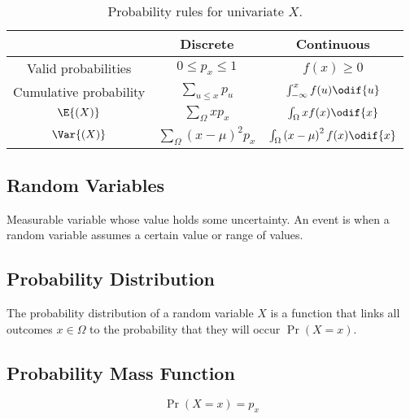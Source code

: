\documentclass{article}
\begin{document}
\begin{minipage}{126.1962963mm}
    \begin{table}[H]
        \centering
        \begin{tabular}{c c c }
            \toprule
                                       & \textbf{Discrete}                              & \textbf{Continuous}                                    \\
            \midrule
            Valid probabilities        & \(0 \leq p_x \leq 1\)                          & \(f(x) \geq 0\)                                        \\
            Cumulative probability     & \(\sum_{u \leq x} p_u\)                        & \(\int_{-\infty}^{x} f(u) \odif{u}\)                   \\
            \(\E{\left( X \right)}\)   & \(\sum_{\Omega} xp_x\)                         & \(\int_{\Omega} xf(x)\odif{x}\)                        \\
            \(\Var{\left( X \right)}\) & \(\sum_{\Omega} \left( x - \mu \right)^2 p_x\) & \(\int_{\Omega} \left( x - \mu \right)^2f(x)\odif{x}\) \\
            \bottomrule
        \end{tabular}
        \caption{Probability rules for univariate \(X\).} %
    \end{table}
    \begin{multicols}{2}
        \section{Random Variables}
        Measurable variable whose value holds some uncertainty.
        An event is when a random variable assumes a certain value or range of values.
        \subsection{Probability Distribution}
        The probability distribution of a random variable \(X\) is a function that links all outcomes \(x \in \Omega\)
        to the probability that they will occur \(\Pr{\left( X = x \right)}\).
        \subsection{Probability Mass Function}
        \begin{equation*}
            \Pr{\left( X = x \right)} = p_x
        \end{equation*}

\end{multicols}
\end{minipage}
\end{document}
